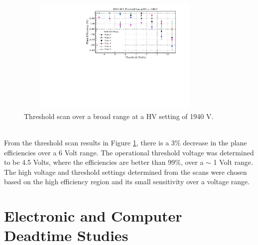 \documentclass[letterpaper, 12 pt, conference]{ieeeconf}  %
\begin{document}
\begin{figure}[h!]
  \centering
  \includegraphics[width=3.8in, height=2.2in]{dc2_tests/dc2_thrsscan_HV_1940V.pdf}
  \caption{Threshold scan over a broad range at a HV setting of 1940 V.}
  \label{fig:hdc2_thrsscan}
\end{figure} \\
From the threshold scan results in Figure \ref{fig:hdc2_thrsscan}, there is a 3$\%$ decrease in the plane efficiencies over a
6 Volt range. The operational threshold voltage was determined to be 4.5 Volts, where the efficiencies are better than 99$\%$, over a $\sim$ 1 Volt range.
The high voltage and threshold settings determined from the scans were chosen based on the high efficiency region and its small sensitivity over a voltage range.  


\section{Electronic and Computer Deadtime Studies}
\end{document}
